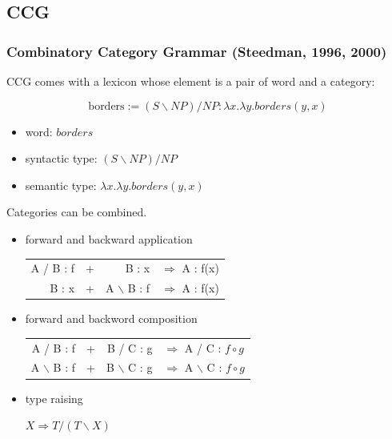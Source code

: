 \documentclass{beamer}
\begin{document}
\subsection{CCG}

\begin{frame}
    \frametitle{Combinatory Category Grammar (Steedman, 1996, 2000)}

     {
        CCG comes with a lexicon whose element is a pair of word and a category:

        \[
            \text{borders} := (S \backslash NP) / NP : \lambda x . \lambda y . borders(y, x)
        \]

        \begin{itemize}
            \item word: $borders$
            \item syntactic type: $(S \backslash NP) / NP$
            \item semantic type: $\lambda x . \lambda y . borders(y, x)$
        \end{itemize}
    }

     {
        Categories can be combined.

        \begin{itemize}
            \item forward and backward application

                \begin{tabular}{rlrl}
                    A / B : f &+  &B : x        &$\Rightarrow$ A : f(x) \\
                        B : x &+  &A $\backslash$ B : f &$\Rightarrow$ A : f(x)
                \end{tabular}

            \item forward and backword composition

                \begin{tabular}{rlrl}
                    A / B : f &+  &B / C : g   &$\Rightarrow$ A / C : $f\circ g$  \\
                    A $\backslash$ B : f &+  &B $\backslash$ C : g &$\Rightarrow$
                        A $\backslash$ C : $f\circ g$  \\
                \end{tabular}

            \item type raising

                $X \Rightarrow T / (T \backslash X)$


\end{itemize}}
\end{frame}
\end{document}
